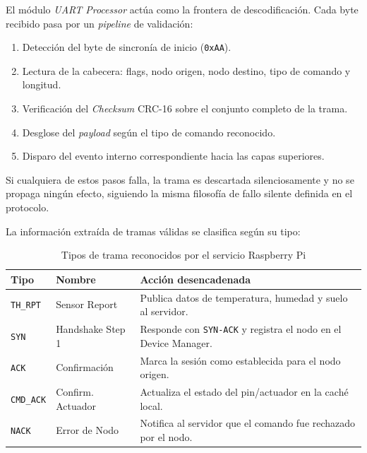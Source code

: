 El módulo \textit{UART Processor} actúa como la frontera de descodificación. Cada byte recibido 
pasa por un \textit{pipeline} de validación:

\begin{enumerate}
    \item Detección del byte de sincronía de inicio (\texttt{0xAA}).
    \item Lectura de la cabecera: flags, nodo origen, nodo destino, tipo de comando y longitud.
    \item Verificación del \textit{Checksum} CRC-16 sobre el conjunto completo de la trama.
    \item Desglose del \textit{payload} según el tipo de comando reconocido.
    \item Disparo del evento interno correspondiente hacia las capas superiores.
\end{enumerate}

Si cualquiera de estos pasos falla, la trama es descartada silenciosamente y no se propaga ningún 
efecto, siguiendo la misma filosofía de fallo silente definida en el protocolo.

La información extraída de tramas válidas se clasifica según su tipo:

\begin{table}[H]
    \centering
    \caption{Tipos de trama reconocidos por el servicio Raspberry Pi}
    \begin{tabular}{llp{7.5cm}}
        \toprule
        \textbf{Tipo}      & \textbf{Nombre}   & \textbf{Acción desencadenada} \\
        \midrule
        \texttt{TH\_RPT}   & Sensor Report     & Publica datos de temperatura, humedad y suelo al servidor. \\
        \texttt{SYN}       & Handshake Step 1  & Responde con \texttt{SYN-ACK} y registra el nodo en el Device Manager. \\
        \texttt{ACK}       & Confirmación      & Marca la sesión como establecida para el nodo origen. \\
        \texttt{CMD\_ACK}  & Confirm. Actuador & Actualiza el estado del pin/actuador en la caché local. \\
        \texttt{NACK}      & Error de Nodo     & Notifica al servidor que el comando fue rechazado por el nodo. \\
        \bottomrule
    \end{tabular}
    \label{tab:rpi_frames}
\end{table}


